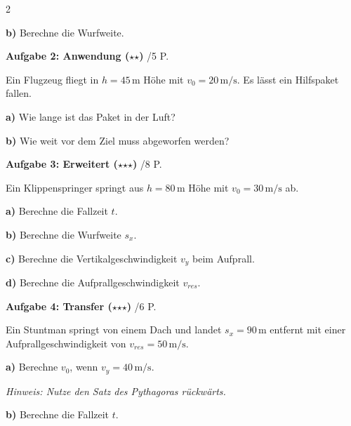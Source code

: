 \documentclass[10pt, a4paper]{article}
\newcommand{\fachfarbe}{physik}
\newcommand{\stmark}{$\star$}
\newcommand{\abschnitt}[1]{%
    \vspace{8pt}
    \noindent\textbf{\textcolor{\fachfarbe}{#1}}
    \vspace{4pt}
}
\newcommand{\punkte}[1]{\hfill\small\textcolor{grau}{/#1 P.}}
\begin{document}
\begin{multicols}{2}
\vspace{1.8cm}

\textbf{b)} Berechne die Wurfweite.

\vspace{1.8cm}


\abschnitt{Aufgabe 2: Anwendung (\stmark\stmark)}\punkte{5}

Ein Flugzeug fliegt in $h = 45\,\text{m}$ Höhe mit $v_0 = 20\,\text{m/s}$. Es lässt ein Hilfspaket fallen.

\textbf{a)} Wie lange ist das Paket in der Luft?

\vspace{1.8cm}

\textbf{b)} Wie weit vor dem Ziel muss abgeworfen werden?

\vspace{1.8cm}


\abschnitt{Aufgabe 3: Erweitert (\stmark\stmark\stmark)}\punkte{8}

Ein Klippenspringer springt aus $h = 80\,\text{m}$ Höhe mit $v_0 = 30\,\text{m/s}$ ab.

\textbf{a)} Berechne die Fallzeit $t$.

\vspace{1.5cm}

\textbf{b)} Berechne die Wurfweite $s_x$.

\vspace{1.5cm}

\textbf{c)} Berechne die Vertikalgeschwindigkeit $v_y$ beim Aufprall.

\vspace{1.5cm}

\textbf{d)} Berechne die Aufprallgeschwindigkeit $v_{res}$.

\vspace{1.5cm}


\abschnitt{Aufgabe 4: Transfer (\stmark\stmark\stmark)}\punkte{6}

Ein Stuntman springt von einem Dach und landet $s_x = 90\,\text{m}$ entfernt mit einer Aufprallgeschwindigkeit von $v_{res} = 50\,\text{m/s}$.

\textbf{a)} Berechne $v_0$, wenn $v_y = 40\,\text{m/s}$.

\textit{Hinweis: Nutze den Satz des Pythagoras rückwärts.}

\vspace{2cm}

\textbf{b)} Berechne die Fallzeit $t$.

\vspace{1.5cm}

\end{multicols}
\end{document}
